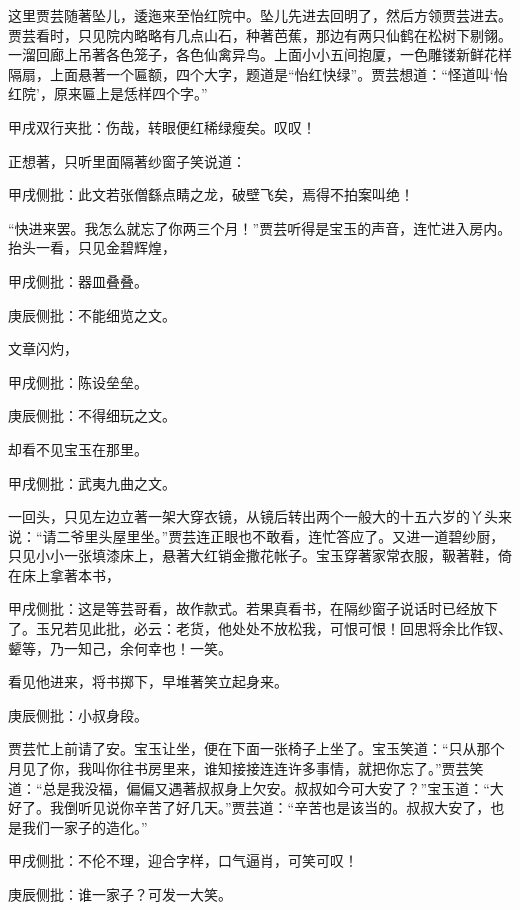 \begin{parag}
    这里贾芸随著坠儿，逶迤来至怡红院中。坠儿先进去回明了，然后方领贾芸进去。贾芸看时，只见院内略略有几点山石，种著芭蕉，那边有两只仙鹤在松树下剔翎。一溜回廊上吊著各色笼子，各色仙禽异鸟。上面小小五间抱厦，一色雕镂新鲜花样隔扇，上面悬著一个匾额，四个大字，题道是“怡红快绿”。贾芸想道：“怪道叫‘怡红院’，原来匾上是恁样四个字。”\begin{note}甲戌双行夹批：伤哉，转眼便红稀绿瘦矣。叹叹！\end{note}正想著，只听里面隔著纱窗子笑说道：\begin{note}甲戌侧批：此文若张僧繇点睛之龙，破壁飞矣，焉得不拍案叫绝！\end{note}“快进来罢。我怎么就忘了你两三个月！”贾芸听得是宝玉的声音，连忙进入房内。抬头一看，只见金碧辉煌，\begin{note}甲戌侧批：器皿叠叠。\end{note}\begin{note}庚辰侧批：不能细览之文。\end{note}文章闪灼，\begin{note}甲戌侧批：陈设垒垒。\end{note}\begin{note}庚辰侧批：不得细玩之文。\end{note}却看不见宝玉在那里。\begin{note}甲戌侧批：武夷九曲之文。\end{note}一回头，只见左边立著一架大穿衣镜，从镜后转出两个一般大的十五六岁的丫头来说：“请二爷里头屋里坐。”贾芸连正眼也不敢看，连忙答应了。又进一道碧纱厨，只见小小一张填漆床上，悬著大红销金撒花帐子。宝玉穿著家常衣服，靸著鞋，倚在床上拿著本书，\begin{note}甲戌侧批：这是等芸哥看，故作款式。若果真看书，在隔纱窗子说话时已经放下了。玉兄若见此批，必云：老货，他处处不放松我，可恨可恨！回思将余比作钗、颦等，乃一知己，余何幸也！一笑。\end{note}看见他进来，将书掷下，早堆著笑立起身来。\begin{note}庚辰侧批：小叔身段。\end{note}贾芸忙上前请了安。宝玉让坐，便在下面一张椅子上坐了。宝玉笑道：“只从那个月见了你，我叫你往书房里来，谁知接接连连许多事情，就把你忘了。”贾芸笑道：“总是我没福，偏偏又遇著叔叔身上欠安。叔叔如今可大安了？”宝玉道：“大好了。我倒听见说你辛苦了好几天。”贾芸道：“辛苦也是该当的。叔叔大安了，也是我们一家子的造化。”\begin{note}甲戌侧批：不伦不理，迎合字样，口气逼肖，可笑可叹！\end{note}\begin{note}庚辰侧批：谁一家子？可发一大笑。\end{note}
\end{parag}


